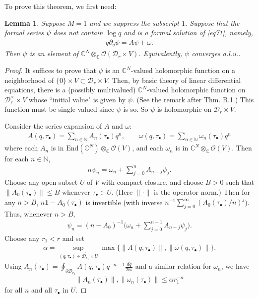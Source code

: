 \documentclass[11pt,b5paper,notitlepage]{article}
\theoremstyle{definition}
\theoremstyle{plain}
\newtheorem{lm}[df]{Lemma}
\newcommand{\mc}{\mathcal}
\newcommand{\ovl}{\overline}
\newcommand{\End}{\mathrm{End}} %
\newcommand{\id}{\mathbf{1}}
\newcommand{\scr}{\mathscr}
\newcommand{\im}{\mathbf{i}}
\newcommand{\mbb}{\mathbb}
\newcommand{\blt}{\bullet}
\newcommand{\Cbb}{\mathbb C}
\newcommand{\Nbb}{\mathbb N}
\numberwithin{equation}{section}
\begin{document}
To prove this theorem, we first need:

\begin{lm}\label{lb59}
Suppose $M=1$ and we suppress the subscript $1$.  Suppose that the formal series $\psi$ does not contain $\log q$ and is a formal solution of \eqref{eq71}, namely,
\begin{align*}
q\partial_q \psi=A\psi+\omega.
\end{align*}
Then $\psi$ is an element of $\Cbb^N\otimes_\Cbb\scr O(\mc D_r\times V)$. Equivalently, $\psi$ converges a.l.u..
\end{lm}

\begin{proof}
It suffices to prove that $\psi$ is an $\Cbb^N$-valued holomorphic function on a neighborhood of $\{0\}\times V\subset\mc D_r\times V$. Then, by basic theory of linear differential equations, there is a (possibly multivalued) $\Cbb^N$-valued holomorphic function on $\mc D_r^\times\times V$ whose ``initial value" is given by $\psi$. (See \cite{Kna} the remark after Thm. B.1.) This function must be single-valued since $\psi$ is so. So $\psi$ is holomorphic on $\mc D_r\times V$.

Consider the series expansion of $A$ and $\omega$:
	\begin{align*}
	A(q,\tau_\blt)=\sum_{n\in\mbb N} A_n(\tau_\blt)q^n,\qquad \omega(q,\tau_\blt)=\sum_{n\in\Nbb}\omega_n(\tau_\blt)q^n
	\end{align*}
	where each $ A_n$ is  in $\End(\Cbb^N)\otimes_\Cbb\scr O(V)$, and each $\omega_n$ is in $\Cbb^N\otimes_\Cbb\scr O(V)$.  Then for each $n\in\mbb N$,
	\begin{align*}
	n\psi_n=\omega_n+\sum_{j=0}^n A_{n-j}\psi_j.
	\end{align*}
	Choose any open subset $U$ of $V$ with compact closure, and choose $B>0$ such that $\lVert A_0(\tau_\bullet)\lVert\leq B$ whenever $\tau_\blt\in U$. (Here $\lVert\cdot\lVert$ is the operator norm.) Then for any $n>B$, $n\id- A_0(\tau_\blt)$ is invertible (with inverse $n^{-1}\sum_{j=0}^\infty( A_0(\tau_\blt)/n)^j $). Thus, whenever $n>B$,
	\begin{align}
	\psi_n=(n- A_0)^{-1}\Big(\omega_n+\sum_{j=0}^{n-1} A_{n-j}\psi_j\Big).\label{eq73}
	\end{align}
	Choose any $r_1<r$ and set
	\begin{align}
	\alpha=\sup_{(q,\tau_\blt)\in {\ovl{\mc D_{r_1}}\times U}}\max\{\lVert A(q,\tau_\blt)\lVert,\lVert\omega(q,\tau_\blt)\lVert\}.\label{eq74}
	\end{align}
	Using $ A_n(\tau_\blt)=\oint_{\partial \mc D_{r_1}} A(q,\tau_\blt)q^{-n-1}\frac{dq}{2\im\pi}$ and a similar relation for $\omega_n$, we have
	\begin{align}
	\lVert A_n(\tau_\blt)\lVert,\lVert\omega_n(\tau_\blt)\lVert\leq \alpha r_1^{-n}\label{eq75}
	\end{align}
	for all $n$ and all  $\tau_\blt$ in $U$.


\end{proof}
\end{document}
